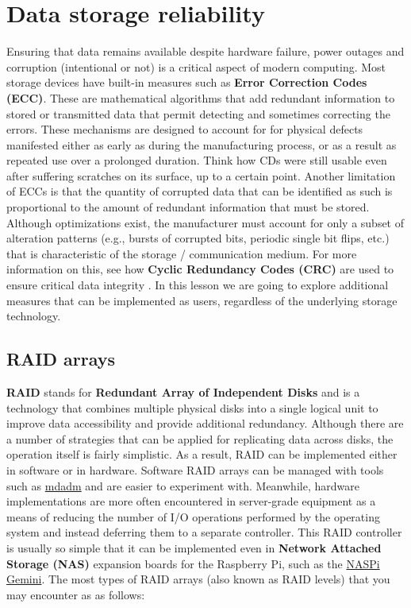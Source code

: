 \section{Data storage reliability}

Ensuring that data remains available despite hardware failure, power outages and
corruption (intentional or not) is a critical aspect of modern computing. Most
storage devices have built-in measures such as \textbf{Error Correction Codes
(ECC)}. These are mathematical algorithms that add redundant information to
stored or transmitted data that permit detecting and sometimes correcting the
errors. These mechanisms are designed to account for for physical defects
manifested either as early as during the manufacturing process, or as a result
as repeated use over a prolonged duration. Think how CDs were still usable
even after suffering scratches on its surface, up to a certain point. Another
limitation of ECCs is that the quantity of corrupted data that can be identified
as such is proportional to the amount of redundant information that must be
stored. Although optimizations exist, the manufacturer must account for only a
subset of alteration patterns (e.g., bursts of corrupted bits, periodic single
bit flips, etc.) that is characteristic of the storage / communication medium.
For more information on this, see how \textbf{Cyclic Redundancy Codes (CRC)} are
used to ensure critical data integrity \cite{koopman2015selection}. In this
lesson we are going to explore additional measures that can be implemented as
users, regardless of the underlying storage technology.

\subsection{RAID arrays}

\textbf{RAID} stands for \textbf{Redundant Array of Independent Disks} and is a
technology that combines multiple physical disks into a single logical unit to
improve data accessibility and provide additional redundancy. Although there are
a number of strategies that can be applied for replicating data across disks,
the operation itself is fairly simplistic. As a result, RAID can be implemented
either in software or in hardware. Software RAID arrays can be managed with
tools such as \href{https://www.man7.org/linux/man-pages/man8/mdadm.8.html}
{mdadm} and are easier to experiment with. Meanwhile, hardware implementations
are more often encountered in server-grade equipment as a means of reducing the
number of I/O operations performed by the operating system and instead deferring
them to a separate controller. This RAID controller is usually so simple that it
can be implemented even in \textbf{Network Attached Storage (NAS)} expansion
boards for the Raspberry Pi, such as the
\href{https://wiki.geekworm.com/NASPi_Gemini_2.5}{NASPi Gemini}. The most types
of RAID arrays (also known as RAID levels) that you may encounter as as
follows:

